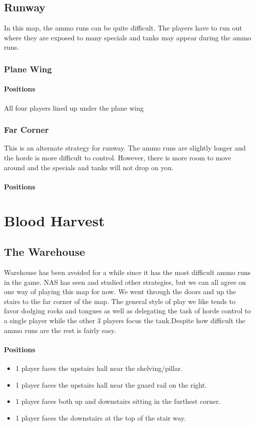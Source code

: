 \subsection{Runway}
In this map, the ammo runs can be quite difficult. The players have to run out where they are exposed to many specials and tanks may appear during the ammo runs.
\subsubsection{Plane Wing}
\paragraph{Positions}
All four players lined up under the plane wing

\subsubsection{Far Corner}
This is an alternate strategy for runway. The ammo runs are slightly longer and the horde is more difficult to control. However, there is more room to move around and the specials and tanks will not drop on you.
\paragraph{Positions}

\section{Blood Harvest}
\subsection{The Warehouse}
Warehouse has been avoided for a while since it has the most difficult ammo runs in the game. NAS has seen and studied other strategies, but we can all agree on one way of playing this map for now. We went through the doors and up the stairs to the far corner of the map. The general style of play we like tends to favor dodging rocks and tongues as well as delegating the task of horde control to a single player while the other 3 players focus the tank.Despite how difficult the ammo runs are the rest is fairly easy. 

\paragraph{Positions}
\begin{itemize}
\item 1 player faces the upstairs hall near the shelving/pillar.
\item 1 player faces the upstairs hall near the guard rail on the right.
\item 1 player faces both up and downstairs sitting in the furthest corner.
\item 1 player faces the downstairs at the top of the stair way.
\end{itemize}

